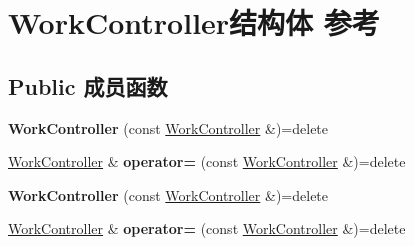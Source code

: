 \hypertarget{struct_work_controller}{}\section{Work\+Controller结构体 参考}
\label{struct_work_controller}
\subsection*{Public 成员函数}
\begin{DoxyCompactItemize}
\item 
\mbox{\label{struct_work_controller_a4f1b152cf7a264704a5a5f5d747068ac}} 
{\bfseries Work\+Controller} (const \mbox{\hyperlink{struct_work_controller}{Work\+Controller}} \&)=delete
\item 
\mbox{\label{struct_work_controller_ad18fb0f2b60441bc2ebbe82ebe43e31d}} 
\mbox{\hyperlink{struct_work_controller}{Work\+Controller}} \& {\bfseries operator=} (const \mbox{\hyperlink{struct_work_controller}{Work\+Controller}} \&)=delete
\item 
\mbox{\label{struct_work_controller_a4f1b152cf7a264704a5a5f5d747068ac}} 
{\bfseries Work\+Controller} (const \mbox{\hyperlink{struct_work_controller}{Work\+Controller}} \&)=delete
\item 
\mbox{\label{struct_work_controller_ad18fb0f2b60441bc2ebbe82ebe43e31d}} 
\mbox{\hyperlink{struct_work_controller}{Work\+Controller}} \& {\bfseries operator=} (const \mbox{\hyperlink{struct_work_controller}{Work\+Controller}} \&)=delete
\end{DoxyCompactItemize}
